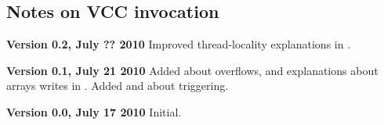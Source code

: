 \subsection{Notes on VCC invocation}
\label{sect:todo-invoke}


\noindent \textbf{Version 0.2, July ?? 2010}
Improved thread-locality explanations in .

\noindent \textbf{Version 0.1, July 21 2010}
Added  about overflows, and explanations about arrays writes in .
Added  and  about triggering.

\noindent \textbf{Version 0.0, July 17 2010}
Initial.

% 
%

